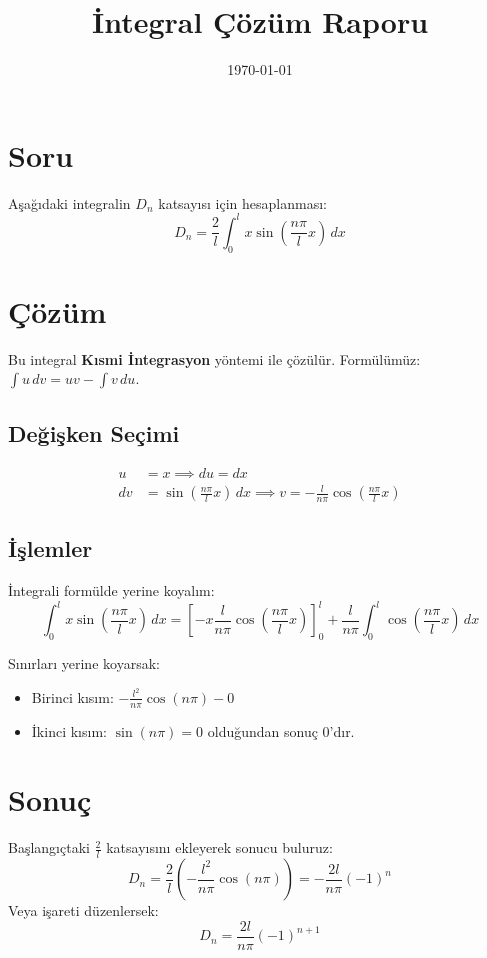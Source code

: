 \documentclass{article}
\title{İntegral Çözüm Raporu}
\author{}
\date{\today}
\begin{document}
\maketitle

\section*{Soru}
Aşağıdaki integralin $D_n$ katsayısı için hesaplanması:
\[
D_n = \frac{2}{l} \int_0^l x \sin\left(\frac{n\pi}{l}x\right) \, dx
\]

\section*{Çözüm}
Bu integral \textbf{Kısmi İntegrasyon} yöntemi ile çözülür. Formülümüz: $\int u \, dv = uv - \int v \, du$.

\subsection*{Değişken Seçimi}
\begin{align*}
u &= x \implies du = dx \\
dv &= \sin\left(\frac{n\pi}{l}x\right) \, dx \implies v = -\frac{l}{n\pi} \cos\left(\frac{n\pi}{l}x\right)
\end{align*}

\subsection*{İşlemler}
İntegrali formülde yerine koyalım:
\[
\int_0^l x \sin\left(\frac{n\pi}{l}x\right) \, dx = \left[ -x \frac{l}{n\pi} \cos\left(\frac{n\pi}{l}x\right) \right]_0^l + \frac{l}{n\pi} \int_0^l \cos\left(\frac{n\pi}{l}x\right) \, dx
\]

Sınırları yerine koyarsak:
\begin{itemize}
    \item Birinci kısım: $-\frac{l^2}{n\pi}\cos(n\pi) - 0$
    \item İkinci kısım: $\sin(n\pi) = 0$ olduğundan sonuç 0'dır.
\end{itemize}

\section*{Sonuç}
Başlangıçtaki $\frac{2}{l}$ katsayısını ekleyerek sonucu buluruz:
\[
D_n = \frac{2}{l} \left( -\frac{l^2}{n\pi} \cos(n\pi) \right) = -\frac{2l}{n\pi} (-1)^n
\]
Veya işareti düzenlersek:
\[
\boxed{D_n = \frac{2l}{n\pi} (-1)^{n+1}}
\]
\end{document}
